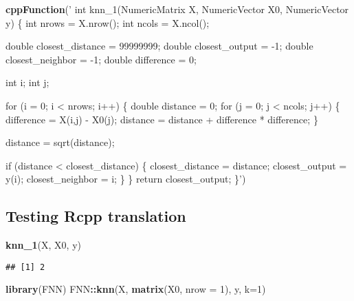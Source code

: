 \documentclass[]{article}
\newenvironment{Shaded}{\begin{snugshade}}{\end{snugshade}}
\newcommand{\DataTypeTok}[1]{\textcolor[rgb]{0.13,0.29,0.53}{#1}}
\newcommand{\DecValTok}[1]{\textcolor[rgb]{0.00,0.00,0.81}{#1}}
\newcommand{\KeywordTok}[1]{\textcolor[rgb]{0.13,0.29,0.53}{\textbf{#1}}}
\newcommand{\NormalTok}[1]{#1}
\newcommand{\OperatorTok}[1]{\textcolor[rgb]{0.81,0.36,0.00}{\textbf{#1}}}
\newcommand{\StringTok}[1]{\textcolor[rgb]{0.31,0.60,0.02}{#1}}
\begin{document}
\begin{Shaded}
\begin{Highlighting}[]
\KeywordTok{cppFunction}\NormalTok{(}\StringTok{'}
\StringTok{int knn_1(NumericMatrix X, NumericVector X0, NumericVector y) \{}
\StringTok{    int nrows = X.nrow();}
\StringTok{    int ncols = X.ncol();}

\StringTok{    double closest_distance = 99999999;}
\StringTok{    double closest_output = -1;}
\StringTok{    double closest_neighbor = -1;}
\StringTok{    double difference = 0;}

\StringTok{    int i;}
\StringTok{    int j;}

\StringTok{    for (i = 0; i < nrows; i++) \{}
\StringTok{        }
\StringTok{        double distance = 0;}
\StringTok{        for (j = 0; j < ncols; j++) \{}
\StringTok{            difference = X(i,j) - X0(j);}
\StringTok{            distance = distance + difference * difference;}
\StringTok{        \}}

\StringTok{        distance = sqrt(distance);}

\StringTok{        if (distance < closest_distance) \{}
\StringTok{            closest_distance = distance;}
\StringTok{            closest_output = y(i);}
\StringTok{            closest_neighbor = i;}
\StringTok{        \}}
\StringTok{    \}}
\StringTok{    return closest_output;}
\StringTok{\}'}\NormalTok{)}
\end{Highlighting}
\end{Shaded}

\hypertarget{testing-rcpp-translation}{%
\subsection{Testing Rcpp translation}\label{testing-rcpp-translation}}

\begin{Shaded}
\begin{Highlighting}[]
\KeywordTok{knn_1}\NormalTok{(X, X0, y)}
\end{Highlighting}
\end{Shaded}

\begin{verbatim}
## [1] 2
\end{verbatim}

\begin{Shaded}
\begin{Highlighting}[]
\KeywordTok{library}\NormalTok{(FNN)}
\NormalTok{FNN}\OperatorTok{::}\KeywordTok{knn}\NormalTok{(X, }\KeywordTok{matrix}\NormalTok{(X0, }\DataTypeTok{nrow =} \DecValTok{1}\NormalTok{), y, }\DataTypeTok{k=}\DecValTok{1}\NormalTok{)}
\end{Highlighting}
\end{Shaded}
\end{document}
